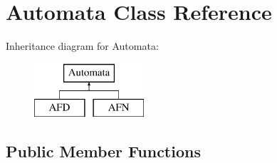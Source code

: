 \hypertarget{class_automata}{}\section{Automata Class Reference}
\label{class_automata}
Inheritance diagram for Automata\+:\begin{figure}[H]
\begin{center}
\leavevmode
\includegraphics[height=2.000000cm]{class_automata}
\end{center}
\end{figure}
\subsection*{Public Member Functions}
